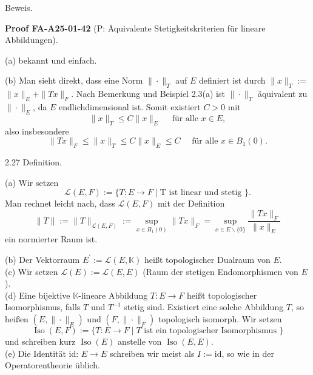 \documentclass[10pt, letterpaper]{article}
\newcommand{\CustomHeading}[3]{%
  \par\medskip\noindent%
  \textbf{#1 #2} \textnormal{(#3)}.\enskip%
}
\newenvironment{PROOF}[2]{\begin{unitbox}\CustomHeading{Proof}{#1}{#2}}{\end{unitbox}}
\begin{document}
Beweis. 

\begin{PROOF}{FA-A25-01-42}{P: Äquivalente Stetigkeitskriterien für lineare Abbildungen}
(a) bekannt und einfach.

(b) Man sieht direkt, dass eine Norm $\|\cdot\|_{T}$ auf $E$ definiert ist durch $\|x\|_{T}:=$ $\|x\|_{E}+\|T x\|_{F}$. Nach Bemerkung und Beispiel 2.3(a) ist $\|\cdot\|_{T}$ äquivalent zu $\|\cdot\|_{E}$, da $E$ endlichdimensional ist. Somit existiert $C>0$ mit
$$
\|x\|_{T} \leq C\|x\|_{E} \quad \text { für alle } x \in E,
$$
also insbesondere
$$
\|T x\|_{F} \leq\|x\|_{T} \leq C\|x\|_{E} \leq C \quad \text { für alle } x \in B_{1}(0) .
$$
\end{PROOF}


2.27 Definition. 

(a) Wir setzen
$$
\mathcal{L}(E, F):=\{T: E \rightarrow F \mid \mathrm{T} \text { ist linear und stetig }\} .
$$
Man rechnet leicht nach, dass $\mathcal{L}(E, F)$ mit der Definition
$$
\|T\|:=\|T\|_{\mathcal{L}(E, F)}:=\sup _{x \in B_{1}(0)}\|T x\|_{F}=\sup _{x \in E \backslash\{0\}} \frac{\|T x\|_{F}}{\|x\|_{E}}
$$
ein normierter Raum ist.

(b) Der Vektorraum $E^{\prime}:=\mathcal{L}(E, \mathbb{K})$ heißt topologischer Dualraum von $E$.\\

(c) Wir setzen $\mathcal{L}(E):=\mathcal{L}(E, E)$ (Raum der stetigen Endomorphismen von $E$ ).\\

(d) Eine bijektive $\mathbb{K}$-lineare Abbildung $T: E \rightarrow F$ heißt topologischer Isomorphismus, falls $T$ und $T^{-1}$ stetig sind. Existiert eine solche Abbildung $T$, so heißen $\left(E,\|\cdot\|_{E}\right)$ und $\left(F,\|\cdot\|_{F}\right)$ topologisch isomorph. Wir setzen
$$
\operatorname{Iso}(E, F):=\{T: E \rightarrow F \mid T \text { ist ein topologischer Isomorphismus }\}
$$
und schreiben kurz $\operatorname{Iso}(E)$ anstelle von $\operatorname{Iso}(E, E)$.\\

(e) Die Identität id: $E \rightarrow E$ schreiben wir meist als $I:=\mathrm{id}$, so wie in der Operatorentheorie üblich.
\end{document}
